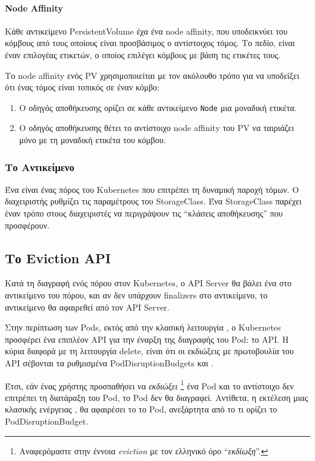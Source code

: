 \paragraph*{Node Affinity}

Κάθε αντικείμενο PersistentVolume έχα ένα node affinity, που υποδεικνύει του
κόμβους από τους οποίους είναι προσβάσιμος ο αντίστοιχος τόμος. Το
 πεδίο, είναι έναν επιλογέας ετικετών, ο οποίος επιλέγει
κόμβους με βάση τις ετικέτες τους.

Το node affinity ενός PV χρησιμοποιείται με τον ακόλουθο τρόπο για να υποδείξει
ότι ένας τόμος είναι τοπικός σε έναν κόμβο:
\begin{enumerate}
      \tightlist
      \item Ο οδηγός αποθήκευσης ορίζει σε κάθε αντικείμενο \texttt{Node} μια μοναδική
            ετικέτα.
      \item Ο οδηγός αποθήκευσης θέτει το αντίστοιχο node affinity του PV να
            ταιριάζει μόνο με τη μοναδική ετικέτα του κόμβου.
\end{enumerate}

\subsubsection{Το Αντικείμενο }

Ένα  είναι ένας πόρος του Kubernetes που επιτρέπει τη δυναμική
παροχή τόμων. Ο διαχειριστής ρυθμίζει τις παραμέτρους του StorageClass. Ένα
StorageClass παρέχει έναν τρόπο στους διαχειριστές να περιγράψουν τις
``κλάσεις αποθήκευσης'' που προσφέρουν.

\subsection{Το Eviction API}


Κατά τη διαγραφή ενός πόρου στον Kubernetes, ο API Server θα βάλει ένα
 στο αντικείμενο του πόρου, και αν δεν υπάρχουν
finalizers στο αντικείμενο, το αντικείμενο θα αφαιρεθεί από τον API Server.

Στην περίπτωση των Pods, εκτός από την κλασική λειτουργία , ο
Kubernetes προσφέρει ένα επιπλέον API για την έναρξη της διαγραφής του Pod: το
 API. Η κύρια διαφορά με τη λειτουργία delete, είναι ότι οι
εκδιώξεις με πρωτοβουλία του API σέβονται τα ρυθμισμένα PodDisruptionBudgets και
.

Έτσι, εάν ένας χρήστης προσπαθήσει να \textit{εκδιώξει} \footnote{Αναφερόμαστε
      στην έννοια \textit{eviction} με τον ελληνικό όρο ``\textit{εκδίωξη}''.} ένα Pod και
      το αντίστοιχο  δεν επιτρέπει τη διατάραξη του Pod,
      το Pod δεν θα διαγραφεί. Αντίθετα, η εκτέλεση μιας κλασικής
      ενέργειας , θα αφαιρέσει το το Pod, ανεξάρτητα από το τι ορίζει
      το PodDisruptionBudget.

